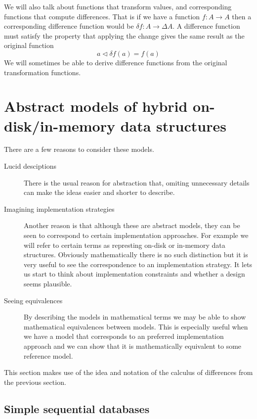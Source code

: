 \documentclass[11pt,a4paper]{article}
\begin{document}
We will also talk about functions that transform values, and corresponding
functions that compute differences. That is if we have a function $f : A \to A$
then a corresponding difference function would be $\delta{f} : A \to \Delta{A}$.
A difference function must satisfy the property that applying the change gives
the same result as the original function
\begin{equation}
  a \triangleleft \delta{f}(a) = f(a)
\end{equation}
We will sometimes be able to derive difference functions from the original
transformation functions.

\section{Abstract models of hybrid on-disk/in-memory data structures}

There are a few reasons to consider these models.
\begin{description}
\item[Lucid desciptions]
There is the usual reason for abstraction that, omiting unnecessary details can
make the ideas easier and shorter to describe.

\item[Imagining implementation strategies]
Another reason is that although these are abstract models, they can be seen
to correspond to certain implementation approaches. For example we will refer
to certain terms as represting on-disk or in-memory data structures. Obviously
mathematically there is no such distinction but it is very useful to see the
correspondence to an implementation strategy. It lets us start to think about
implementation constraints and whether a design seems plausible.

\item[Seeing equivalences]
By describing the models in mathematical terms we may be able to show
mathematical equivalences between models. This is especially useful when we
have a model that corresponds to an preferred implementation approach and we
can show that it is mathematically equivalent to some reference model.
\end{description}
This section makes use of the idea and notation of the calculus of differences
from the previous section.

\subsection{Simple sequential databases}
\end{document}
